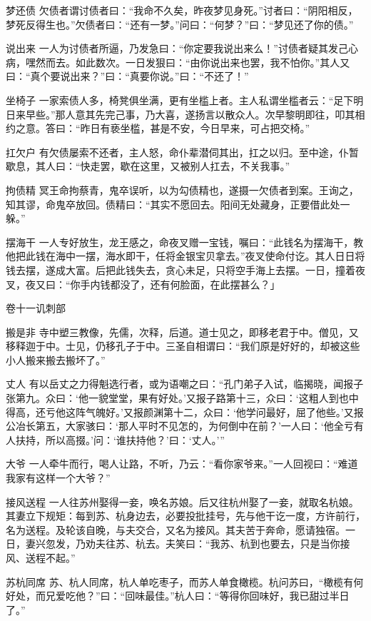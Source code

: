 \documentclass[12pt,UTF8]{ctexbook}
\begin{document}
梦还债
欠债者谓讨债者曰：“我命不久矣，昨夜梦见身死。”讨者曰：“阴阳相反，梦死反得生也。”欠债者曰：“还有一梦。”问曰：“何梦？”曰：“梦见还了你的债。”

说出来
一人为讨债者所逼，乃发急曰：“你定要我说出来么！”讨债者疑其发己心病，嘿然而去。如此数次。一日发狠曰：“由你说出来也罢，我不怕你。”其人又曰：“真个要说出来？”曰：“真要你说。”曰：“不还了！”

坐椅子
一家索债人多，椅凳俱坐满，更有坐槛上者。主人私谓坐槛者云：“足下明日来早些。”那人意其先完己事，乃大喜，遂扬言以散众人。次早黎明即往，叩其相约之意。答曰：“昨日有亵坐槛，甚是不安，今日早来，可占把交椅。”

扛欠户
有欠债屡索不还者，主人怒，命仆辈潜伺其出，扛之以归。至中途，仆暂歇息，其人曰：“快走罢，歇在这里，又被别人扛去，不关我事。”

拘债精
冥王命拘蔡青，鬼卒误听，以为勾债精也，遂摄一欠债者到案。王询之，知其谬，命鬼卒放回。债精曰：“其实不愿回去。阳间无处藏身，正要借此处一躲。”

摆海干
一人专好放生，龙王感之，命夜叉赠一宝钱，嘱曰：“此钱名为摆海干，教他把此钱在海中一摆，海水即干，任将金银宝贝拿去。”夜叉使命付讫。其人日日将钱去摆，遂成大富。后把此钱失去，贪心未足，只将空手海上去摆。一日，撞着夜叉，夜又曰：“你手内钱都没了，还有何脸面，在此摆甚么？」

卷十一讥刺部

搬是非
寺中塑三教像，先儒，次释，后道。道士见之，即移老君于中。僧见，又移释迦于中。士见，仍移孔子于中。三圣自相谓曰：“我们原是好好的，却被这些小人搬来搬去搬坏了。”

丈人
有以岳丈之力得魁选行者，或为语嘲之曰：“孔门弟子入试，临揭晓，闻报子张第九。众曰：‘他一貌堂堂，果有好处。’又报子路第十三，众曰：‘这粗人到也中得高，还亏他这阵气魄好。’又报颜渊第十二，众曰：‘他学问最好，屈了他些。’又报公冶长第五，大家骇曰：‘那人平时不见怎的，为何倒中在前？’一人曰：‘他全亏有人扶持，所以高掇。’问：‘谁扶持他？’曰：‘丈人。’”

大爷
一人牵牛而行，喝人让路，不听，乃云：“看你家爷来。”一人回视曰：“难道我家有这样一个大爷？”

接风送程
一人往苏州娶得一妾，唤名苏娘。后又往杭州娶了一妾，就取名杭娘。其妻立下规矩：每到苏、杭身边去，必要投批挂号，先与他干讫一度，方许前行，名为送程。及轮该自晚，与夫交合，又名为接风。其夫苦于奔命，愿请独宿。一日，妻兴忽发，乃劝夫往苏、杭去。夫笑曰：“我苏、杭到也要去，只是当你接风、送程不起。”

苏杭同席
苏、杭人同席，杭人单吃枣子，而苏人单食橄榄。杭问苏曰，“橄榄有何好处，而兄爱吃他？”曰：“回味最佳。”杭人曰：“等得你回味好，我已甜过半日了。”
\end{document}
